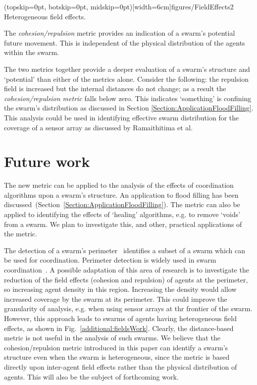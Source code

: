 \documentclass{ieeeaccess}
\begin{document}
\Figure[t!](topskip=0pt, botskip=0pt, midskip=0pt)[width=6cm]{figures/FieldEffects2}
{Heterogeneous field effects.\label{additional:fieldsWork}}

The \textit{cohesion/repulsion} metric provides an indication of a swarm's potential future movement. This is independent of the physical distribution of the agents within the swarm. 

The two metrics together provide a deeper evaluation of a swarm's structure and `potential' than either of the metrics alone. Consider the following: the repulsion field is increased but the internal distances do not change; as a result the \textit{cohesion/repulsion metric} falls below zero. This indicates `something' is confining the swarm's distribution as discussed in Section \ref{Section:ApplicationFloodFilling}. This analysis could be used in identifying effective swarm distribution for the coverage of a sensor array as discussed by Ramaithitima et al.~\cite{RWBK:15}


\section{Future work}\label{Section:FutureWork}
The new metric can be applied to the analysis of the effects of coordination
algorithms upon a swarm's structure. An application to flood filling has
been discussed~(Section~\ref{Section:ApplicationFloodFilling}). The metric can also be applied to identifying the effects of 
`healing' algorithms, e.g. to remove `voids' from a swarm. We plan
to investigate this, and other, practical applications of the metric.

The detection of a swarm's perimeter~\cite{MD:09, MJ:08, ZAPS:07, JG:13}
identifies a subset of a swarm which can be used for coordination. 
Perimeter detection is widely used in swarm coordination~\cite{ZFG:13, AKK:08,
APZDAMC:09, AZDPS:11}. A possible adaptation of this area of research is to
investigate the reduction of the field effects (cohesion and repulsion) of
agents at the perimeter, so increasing agent density in this region. Increasing
the density would allow increased coverage by the swarm at its perimeter. This
could improve the granularity of analysis, e.g. when using sensor arrays at
thr frontier of the swarm.
However, this approach leads to swarms of agents having heterogeneous field
effects, as shown in Fig.~\ref{additional:fieldsWork}. Clearly, the
distance-based metric is not useful in the analysis of such swarms. We believe
that the cohesion/repulsion metric introduced in this paper can identify a
swarm's structure even when the swarm is heterogeneous, since the metric is
based directly upon inter-agent field effects rather than the physical
distribution of agents. This will also be the subject of forthcoming work.
\end{document}
